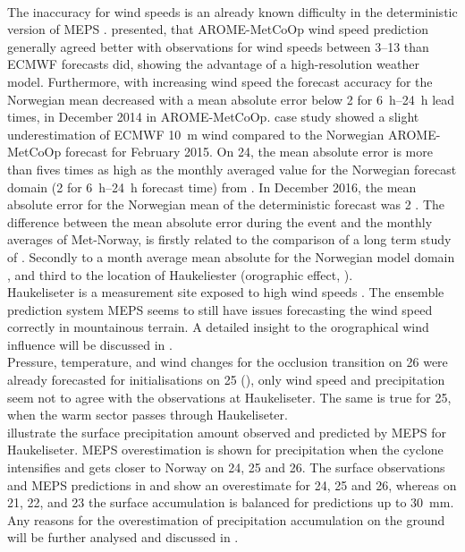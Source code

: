 \noindent
\\
The inaccuracy for wind speeds is an already known difficulty in the deterministic version of MEPS \citep{muller_arome-metcoop:_2017}. \citet{muller_arome-metcoop:_2017} presented, that AROME-MetCoOp wind speed prediction generally agreed better with observations for wind speeds between \SIrange{3}{13}{\mPs} than ECMWF forecasts did, showing the advantage of a high-resolution weather model. Furthermore, with increasing wind speed the forecast accuracy for the Norwegian mean decreased with a mean absolute error below \SI{2}{\mPs} for \SIrange{6}{24}{\hour} lead times, in December 2014 in AROME-MetCoOp. \citet{muller_arome-metcoop:_2017} case study showed a slight underestimation of ECMWF \SI{10}{\metre} wind compared to the Norwegian AROME-MetCoOp forecast for February 2015. %
On \SI{24}{\dec}, the mean absolute error is more than fives times as high as the monthly averaged value for the Norwegian forecast domain (\SI{2}{\mPs} for \SIrange{6}{24}{\hour} forecast time) from \citet{muller_arome-metcoop:_2017}. 
In December 2016, the mean absolute error for the Norwegian mean of the deterministic forecast was \SI{2}{\mPs} \citep{homleid_verification_2016}.
The difference between the mean absolute error during the event and the monthly averages of Met-Norway, is firstly related to the comparison of a long term study of \citet{muller_arome-metcoop:_2017}. Secondly to a month average mean absolute for the Norwegian model domain \citep{muller_arome-metcoop:_2017,homleid_verification_2016}, and third to the location of Haukeliester (orographic effect, ). 
\\
Haukeliseter is a measurement site exposed to high wind speeds \citep{wolff_measurements_2013,wolff_derivation_2015}. The ensemble prediction system MEPS seems to still have issues forecasting the wind speed correctly in mountainous terrain.
A detailed insight to the orographical wind influence will be discussed in . 
\\
Pressure, temperature, and wind changes for the occlusion transition on \SI{26}{\dec} were already forecasted for initialisations on \SI{25}{\dec} (), only wind speed and precipitation seem not to agree with the observations at Haukeliseter. The same is true for \SI{25}{\dec}, when the warm sector passes through Haukeliseter. 
\\
 illustrate the surface precipitation amount observed and predicted by MEPS for Haukeliseter. MEPS overestimation is shown for precipitation when the cyclone intensifies and gets closer to Norway on \num{24}, \num{25} and \SI{26}{\dec}. The surface observations and MEPS predictions in  and  show an overestimate for \num{24}, \num{25} and \SI{26}{\dec}, whereas on \num{21}, \num{22}, and \SI{23}{\dec} the surface accumulation is balanced for  predictions up to \SI{30}{\mm}. Any reasons for the overestimation of precipitation accumulation on the ground will be further analysed and discussed in . 
